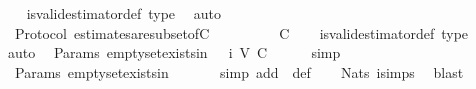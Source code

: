 \begin{isabellebody}
%
\isadelimproof
\ \ %
\endisadelimproof
%
\isatagproof
{}\isamarkupfalse%
\ is{\isacharunderscore}valid{\isacharunderscore}estimator{\isacharunderscore}def\ {\isasymepsilon}{\isacharunderscore}type\ \isamarkupfalse%
\ auto%
\endisatagproof
{\isafoldproof}%
%
\isadelimproof
\isanewline
%
\endisadelimproof
\isanewline
{}\isamarkupfalse%
\ {\isacharparenleft}\ Protocol{\isacharparenright}\ estimates{\isacharunderscore}are{\isacharunderscore}subset{\isacharunderscore}of{\isacharunderscore}C{\isacharcolon}\ {\isachardoublequoteopen}{\isasymAnd}\ {\isasymsigma}{\isachardot}\ {\isasymsigma}\ {\isasymin}\ {\isasymSigma}\ {\isasymLongrightarrow}\ {\isasymepsilon}\ {\isasymsigma}\ {\isasymsubseteq}\ C{\isachardoublequoteclose}\isanewline
%
\isadelimproof
\ \ %
\endisadelimproof
%
\isatagproof
{}\isamarkupfalse%
\ is{\isacharunderscore}valid{\isacharunderscore}estimator{\isacharunderscore}def\ {\isasymepsilon}{\isacharunderscore}type\ \isamarkupfalse%
\ auto%
\endisatagproof
{\isafoldproof}%
%
\isadelimproof
\isanewline
%
\endisadelimproof
\isanewline
{}\isamarkupfalse%
\ {\isacharparenleft}\ Params{\isacharparenright}\ empty{\isacharunderscore}set{\isacharunderscore}exists{\isacharunderscore}in{\isacharunderscore}{\isasymSigma}{\isacharunderscore}{}{\isacharcolon}\ {\isachardoublequoteopen}{\isasymemptyset}\ {\isasymin}\ {\isasymSigma}i\ {\isacharparenleft}V{\isacharcomma}\ C{\isacharcomma}\ {\isasymepsilon}{\isacharparenright}\ {}{\isachardoublequoteclose}\isanewline
%
\isadelimproof
\ \ %
\endisadelimproof
%
\isatagproof
{}\isamarkupfalse%
\ simp%
\endisatagproof
{\isafoldproof}%
%
\isadelimproof
\isanewline
%
\endisadelimproof
\isanewline
{}\isamarkupfalse%
\ {\isacharparenleft}\ Params{\isacharparenright}\ empty{\isacharunderscore}set{\isacharunderscore}exists{\isacharunderscore}in{\isacharunderscore}{\isasymSigma}{\isacharcolon}\ {\isachardoublequoteopen}{\isasymemptyset}\ {\isasymin}\ {\isasymSigma}{\isachardoublequoteclose}\isanewline
%
\isadelimproof
\ \ %
\endisadelimproof
%
\isatagproof
{}\isamarkupfalse%
\ {\isacharparenleft}simp\ add{\isacharcolon}\ \ {\isasymSigma}{\isacharunderscore}def{\isacharparenright}\isanewline
\ \ \isamarkupfalse%
\ Nats{\isacharunderscore}{}\ {\isasymSigma}i{\isachardot}simps{\isacharparenleft}{}{\isacharparenright}\ \isamarkupfalse%
\ blast%
\endisatagproof
{\isafoldproof}%

\end{isabellebody}
